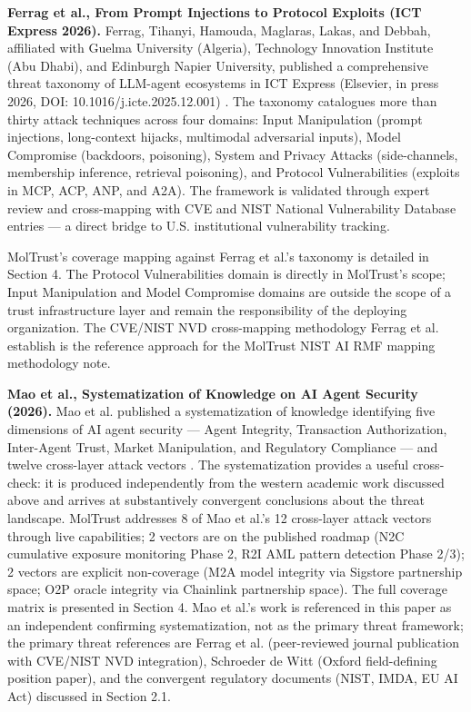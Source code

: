\textbf{Ferrag et al., From Prompt Injections to Protocol Exploits (ICT Express 2026).} Ferrag, Tihanyi, Hamouda, Maglaras, Lakas, and Debbah, affiliated with Guelma University (Algeria), Technology Innovation Institute (Abu Dhabi), and Edinburgh Napier University, published a comprehensive threat taxonomy of LLM-agent ecosystems in ICT Express (Elsevier, in press 2026, DOI: 10.1016/j.icte.2025.12.001) \cite{ref18_ferrag}. The taxonomy catalogues more than thirty attack techniques across four domains: Input Manipulation (prompt injections, long-context hijacks, multimodal adversarial inputs), Model Compromise (backdoors, poisoning), System and Privacy Attacks (side-channels, membership inference, retrieval poisoning), and Protocol Vulnerabilities (exploits in MCP, ACP, ANP, and A2A). The framework is validated through expert review and cross-mapping with CVE and NIST National Vulnerability Database entries — a direct bridge to U.S. institutional vulnerability tracking.


MolTrust's coverage mapping against Ferrag et al.'s taxonomy is detailed in Section 4. The Protocol Vulnerabilities domain is directly in MolTrust's scope; Input Manipulation and Model Compromise domains are outside the scope of a trust infrastructure layer and remain the responsibility of the deploying organization. The CVE/NIST NVD cross-mapping methodology Ferrag et al. establish is the reference approach for the MolTrust NIST AI RMF mapping methodology note.


\textbf{Mao et al., Systematization of Knowledge on AI Agent Security (2026).} Mao et al. published a systematization of knowledge identifying five dimensions of AI agent security — Agent Integrity, Transaction Authorization, Inter-Agent Trust, Market Manipulation, and Regulatory Compliance — and twelve cross-layer attack vectors \cite{ref20_mao}. The systematization provides a useful cross-check: it is produced independently from the western academic work discussed above and arrives at substantively convergent conclusions about the threat landscape. MolTrust addresses 8 of Mao et al.'s 12 cross-layer attack vectors through live capabilities; 2 vectors are on the published roadmap (N2C cumulative exposure monitoring Phase 2, R2I AML pattern detection Phase 2/3); 2 vectors are explicit non-coverage (M2A model integrity via Sigstore partnership space; O2P oracle integrity via Chainlink partnership space). The full coverage matrix is presented in Section 4. Mao et al.'s work is referenced in this paper as an independent confirming systematization, not as the primary threat framework; the primary threat references are Ferrag et al. (peer-reviewed journal publication with CVE/NIST NVD integration), Schroeder de Witt (Oxford field-defining position paper), and the convergent regulatory documents (NIST, IMDA, EU AI Act) discussed in Section 2.1.



